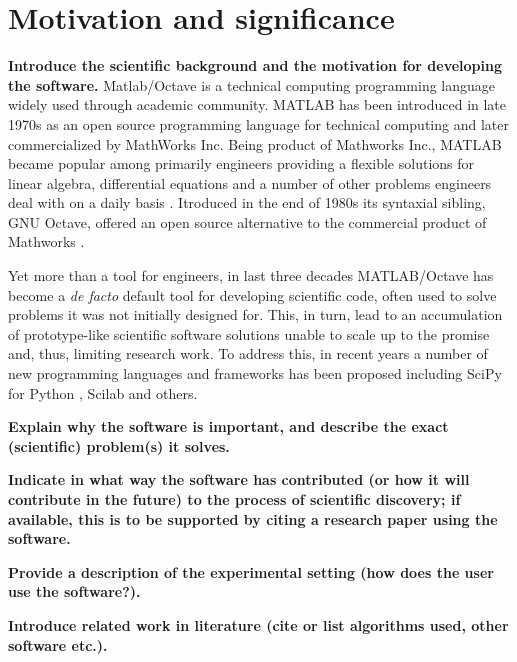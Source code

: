 \section{Motivation and significance}
\label{} 

\textbf{Introduce the scientific background and the motivation for developing the software.}
Matlab/Octave is a technical computing programming language widely used through academic community. MATLAB has been introduced in late 1970s as an open source programming language for technical computing and later commercialized by MathWorks Inc. Being product of Mathworks Inc., MATLAB became popular among primarily engineers providing a flexible solutions for linear algebra, differential equations and a number of other problems engineers deal with on a daily basis \cite{moore2014matlab}. Itroduced in the end of 1980s its syntaxial sibling, GNU Octave, offered an open source alternative to the commercial product of Mathworks \cite{eaton1997gnu}.

Yet more than a tool for engineers, in last three decades MATLAB/Octave has become a \textit{de facto} default tool for developing scientific code, often used to solve problems it was not initially designed for. This, in turn, lead to an accumulation of prototype-like scientific software solutions unable to scale up to the promise and, thus, limiting research work. To address this, in recent years a number of new programming languages and frameworks has been proposed including SciPy for Python \cite{jones2001open, Olivier_2002}, Scilab and others. 

\textbf{Explain why the software is important, and describe the exact (scientific) problem(s) it solves.}


\textbf{Indicate in what way the software has contributed (or how it will contribute in the future) to the process of scientific discovery; if available, this is to be supported by citing a research paper using the software.}


\textbf{Provide a description of the experimental setting (how does the user use the software?).}


\textbf{Introduce related work in literature (cite or list algorithms used, other software etc.).}

    
    
    
    
    
    
    
    